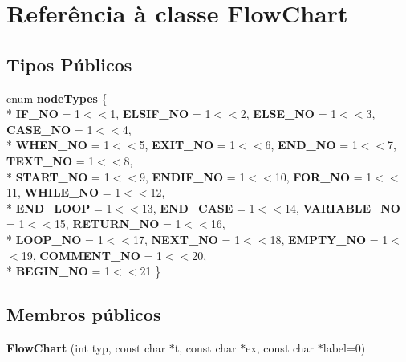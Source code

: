 \hypertarget{class_flow_chart}{\section{Referência à classe Flow\-Chart}
\label{class_flow_chart}
}
\subsection*{Tipos Públicos}
\begin{DoxyCompactItemize}
\item 
enum {\bfseries node\-Types} \{ \\*
{\bfseries I\-F\-\_\-\-N\-O} = 1$<$$<$1, 
{\bfseries E\-L\-S\-I\-F\-\_\-\-N\-O} = 1$<$$<$2, 
{\bfseries E\-L\-S\-E\-\_\-\-N\-O} = 1$<$$<$3, 
{\bfseries C\-A\-S\-E\-\_\-\-N\-O} = 1$<$$<$4, 
\\*
{\bfseries W\-H\-E\-N\-\_\-\-N\-O} = 1$<$$<$5, 
{\bfseries E\-X\-I\-T\-\_\-\-N\-O} = 1$<$$<$6, 
{\bfseries E\-N\-D\-\_\-\-N\-O} = 1$<$$<$7, 
{\bfseries T\-E\-X\-T\-\_\-\-N\-O} = 1$<$$<$8, 
\\*
{\bfseries S\-T\-A\-R\-T\-\_\-\-N\-O} = 1$<$$<$9, 
{\bfseries E\-N\-D\-I\-F\-\_\-\-N\-O} = 1$<$$<$10, 
{\bfseries F\-O\-R\-\_\-\-N\-O} = 1$<$$<$11, 
{\bfseries W\-H\-I\-L\-E\-\_\-\-N\-O} = 1$<$$<$12, 
\\*
{\bfseries E\-N\-D\-\_\-\-L\-O\-O\-P} = 1$<$$<$13, 
{\bfseries E\-N\-D\-\_\-\-C\-A\-S\-E} = 1$<$$<$14, 
{\bfseries V\-A\-R\-I\-A\-B\-L\-E\-\_\-\-N\-O} = 1$<$$<$15, 
{\bfseries R\-E\-T\-U\-R\-N\-\_\-\-N\-O} = 1$<$$<$16, 
\\*
{\bfseries L\-O\-O\-P\-\_\-\-N\-O} = 1$<$$<$17, 
{\bfseries N\-E\-X\-T\-\_\-\-N\-O} = 1$<$$<$18, 
{\bfseries E\-M\-P\-T\-Y\-\_\-\-N\-O} = 1$<$$<$19, 
{\bfseries C\-O\-M\-M\-E\-N\-T\-\_\-\-N\-O} = 1$<$$<$20, 
\\*
{\bfseries B\-E\-G\-I\-N\-\_\-\-N\-O} = 1$<$$<$21
 \}
\end{DoxyCompactItemize}
\subsection*{Membros públicos}
\begin{DoxyCompactItemize}
\item 
\hypertarget{class_flow_chart_a1fe8cbb301fa9c48e5d70df0435d6f37}{{\bfseries Flow\-Chart} (int typ, const char $\ast$t, const char $\ast$ex, const char $\ast$label=0)}\label{class_flow_chart_a1fe8cbb301fa9c48e5d70df0435d6f37}

\end{DoxyCompactItemize}
